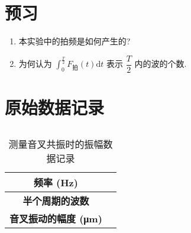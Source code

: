 \documentclass[signature=data]{physicsreport}
\begin{document}
\maketitle

\section{预习}
\begin{enumerate}
    \item 本实验中的拍频是如何产生的?
    \item 为何认为 $\displaystyle\int_{0}^{\frac{T}{2}}F_{\text{拍}}(t)\mathrm{d}t$ 表示 $\dfrac{T}{2}$ 内的波的个数.
\end{enumerate}

\makeatletter
{}
\makeatother

\newpage
\section{原始数据记录}
\subsection{}
\vspace*{-1.5em}
\begin{table}[H]
    \caption{测量音叉共振时的振幅数据记录}
    \vspace*{1em}
    \centering
    \begin{tabular}{|>{\bfseries}c|c|} \hline
        频率 (Hz)                       & \\ \hline
        半个周期的波数                       & \\ \hline
        音叉振动的幅度 (\unit{\micro\meter}) & \\ \hline
    \end{tabular}
\end{table}
\end{document}
